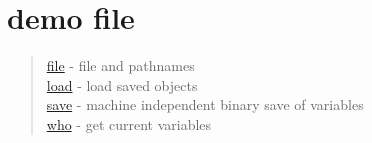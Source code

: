 \chapter*{demo file}

\begin{quote}
\noindent
\hyperlink{file}{file} - file and pathnames\\
\hyperlink{load}{load} - load saved objects\\
\hyperlink{save}{save} - machine independent binary save of variables\\
\hyperlink{who}{who} - get current variables\\
\end{quote}

 
 
 
 
